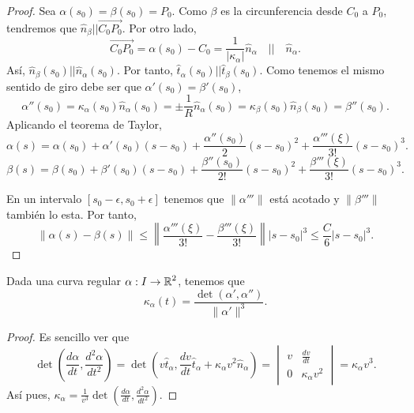 \begin{proof}
Sea $\displaystyle \alpha\left(s_{0}\right)=\beta\left(s_{0}\right)=P_{0} $. Como $\displaystyle \beta  $ es la circunferencia desde $\displaystyle C_{0} $ a $\displaystyle P_{0} $, tendremos que $\displaystyle \hat{n}_{\beta } || \overrightarrow{C_{0}P_{0}} $. Por otro lado, 
\[\overrightarrow{C_{0}P_{0}}=\alpha\left(s_{0}\right)-C_{0}=\frac{1}{ \left|\kappa_{\alpha }\right|}\hat{n}_{\alpha } \quad ||\quad \hat{n}_{\alpha } .\]
Así, $\displaystyle \hat{n}_{\beta }\left(s_{0}\right) || \hat{n}_{\alpha }\left(s_{0}\right) $. Por tanto, $\displaystyle \hat{t}_{\alpha }\left(s_{0}\right) || \hat{t}_{\beta }\left(s_{0}\right) $. Como tenemos el mismo sentido de giro debe ser que $\displaystyle \alpha'\left(s_{0}\right)=\beta'\left(s_{0}\right) $, 
\[\alpha''\left(s_{0}\right)=\kappa_{\alpha }\left(s_{0}\right)\hat{n}_{\alpha }\left(s_{0}\right) = \pm \frac{1}{R}\hat{n}_{\alpha }\left(s_{0}\right) = \kappa_{\beta }\left(s_{0}\right)\hat{n}_{\beta }\left(s_{0}\right)=\beta''\left(s_{0}\right) .\]
Aplicando el teorema de Taylor, 
\[\alpha\left(s\right) = \alpha\left(s_{0}\right) + \alpha'\left(s_{0}\right)\left(s-s_{0}\right) + \frac{\alpha''\left(s_{0}\right)}{2} \left(s-s_{0}\right)^{2} + \frac{\alpha'''\left(\xi\right)}{3!}\left(s-s_{0}\right)^{3} .\]
\[\beta\left(s\right) = \beta\left(s_{0}\right)+\beta'\left(s_{0}\right)\left(s-s_{0}\right) + \frac{\beta''\left(s_{0}\right)}{2!}\left(s-s_{0}\right)^{2} + \frac{\beta'''\left(\xi\right)}{3!} \left(s-s_{0}\right)^{3} .\]

En un intervalo $\displaystyle \left[s_{0}-\epsilon, s_{0} + \epsilon \right]  $ tenemos que $\displaystyle \|\alpha'''\| $ está acotado y $\displaystyle \|\beta'''\| $ también lo esta. Por tanto, 
\[ \|\alpha\left(s\right)-\beta\left(s\right)\| \leq \left\|\frac{\alpha'''\left(\xi\right)}{3!}-\frac{\beta'''\left(\xi\right)}{3!}\right\| \left|s-s_{0}\right|^{3}\leq \frac{C}{6} \left|s-s_{0}\right|^{3} .\]
\end{proof}
\begin{theorem}
Dada una curva regular $\displaystyle \alpha : I \to \mathbb{R}^{2} $, tenemos que 
\[\kappa_{\alpha }\left(t\right)=\frac{\det\left(\alpha', \alpha''\right)}{\|\alpha'\|^{3}} .\]
\end{theorem}
\begin{proof}
Es sencillo ver que 
\[\det\left(\frac{d\alpha }{ dt}, \frac{d^{2}\alpha }{dt ^{2}}\right) = \det\left(v\hat{t}_{\alpha }, \frac{dv}{dt}\hat{t}_{\alpha } + \kappa_{\alpha }v^{2}\hat{n}_{\alpha }\right) = \begin{vmatrix} v & \frac{dv}{dt} \\ 0 & \kappa_{\alpha }v^{2} \end{vmatrix} =\kappa_{\alpha }v^{3} .\]
Así pues, $\displaystyle \kappa_{\alpha }=\frac{1}{v^{3}}\det\left(\frac{d\alpha }{dt}, \frac{d^{2}\alpha }{dt ^{2}}\right) $.
\end{proof}

